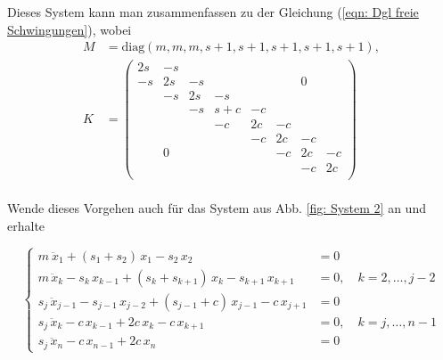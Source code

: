 \documentclass[a4paper,12pt]{report}
\newcommand{\diag}{\text{diag}}
\newcommand{\1}{\mathds{1}}
\theoremstyle{plain} %
\theoremstyle{definition} %
\theoremstyle{remark}
\begin{document}
            Dieses System kann man zusammenfassen zu der Gleichung (\ref{eqn: Dgl freie Schwingungen}),
            wobei \begin{align*}
                  M &= \diag(m, m, m, s+1, s+1,s+1, s+1,  s+1),\\
                  K &= \begin{pmatrix}
                        2s & -s &  &  &  &  &  &  \\
                        -s &  2s& -s &  &  &  &0  &  \\
                         & -s & 2s & -s &  &  &  &  \\
                         &  & -s & s+c & -c &  &  &  \\
                         &  &  & -c & 2c & -c &  &  \\
                         &  &  &  & -c & 2c & -c &  \\
                         & 0 &  &  &  & -c & 2c &  -c\\
                         &  &  &  &  &  & -c & 2c \\
                        \end{pmatrix}
            \end{align*}\\

            Wende dieses Vorgehen auch für das System aus Abb. \ref{fig: System 2} an und erhalte

            
            $$\begin{cases}
                  m\ \ddot x_1 + (s_1+s_2)\,x_1 - s_2\,x_2 & = 0   \\
                  m\,\ddot x_k -s_k\,x_{k-1} + (s_k+s_{k+1})\,x_k -s_{k+1}\,x_{k+1} & = 0,\quad k=2,\dots,j-2\\
                  s_j\,\ddot x_{j-1} -s_{j-1}\,x_{j-2} + (s_{j-1}+c)\,x_{j-1} -c\,x_{j+1} & = 0\\
                  s_j\,\ddot x_k -c\,x_{k-1} + 2c\,x_k -c\,x_{k+1} & = 0,\quad k=j,\dots,n-1\\
                  s_j\,\ddot x_n -c\,x_{n-1}+ 2c\,x_n & = 0
            \end{cases}$$
            
\end{document}
